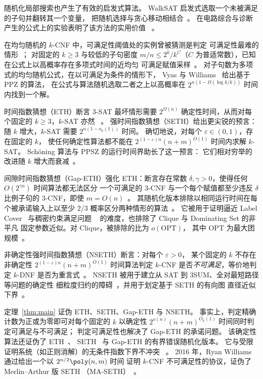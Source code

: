 随机化局部搜索也产生了有效的启发式算法。
WalkSAT 启发式选取一个未被满足的子句并翻转其一个变量，
把随机选择与贪心移动相结合~\cite{SKC94}。
在电路综合与诊断产生的公式上的实验表明了该方法的实用价值
~\cite[pp.~340--342, Tables~4--5]{SKC94}。

在均匀随机的 $k$-CNF 中，可满足性阈值处的实例曾被猜测是判定
可满足性最难的情形~\cite[Section~1]{VW21}；
对固定的 $k\ge3$ 与较低的子句密度 $m/n\le 2^k/k^C$（$C$
为普适常数），已知在公式上以高概率存在多项式时间的近均匀
可满足赋值采样~\cite[Theorem~1.2]{CLWYY25}。
对子句数为多项式的均匀随机公式，在以可满足为条件的情形下，
Vyas 与 Williams~\cite[Theorem~3]{VW21} 给出基于 PPZ 的算法，
在公式与算法随机选取二者之上以高概率在
$2^{n(1-\Omega(\log k/k))}$ 时间内找到一个解。

时间指数猜想（ETH）断言 $3$-SAT 最坏情形需要 $2^{\Omega(n)}$
确定性时间，从而对每个固定的 $k\ge3$，$k$-SAT 亦然
~\cite[Theorem~1]{IP01}。
强时间指数猜想（SETH）给出更尖锐的预言：随 $k$ 增大，$k$-SAT
需要 $2^{n(1-o_k(1))}$ 时间。
确切地说，对每个 $\varepsilon\in(0,1)$，存在固定的 $k$，
使任何确定性算法都不能在 $2^{(1-\varepsilon)n}(n+m)^{O(1)}$
时间内求解 $k$-SAT。
Sch\"oning 算法与 PPSZ 的运行时间界助长了这一预言：
它们相对穷举的改进随 $k$ 增大而衰减~\cite[Open Problems, item~2]{IP01}。

间隙时间指数猜想（Gap-ETH）强化 ETH：断言存在常数
$\delta,\gamma>0$，使得任何 $O(2^{\gamma n})$ 时间算法都无法区分
一个可满足的 $3$-CNF 与一个每个赋值都至少违反 $\delta$
比例子句的 $3$-CNF，即使 $m=O(n)$~\cite{Din16,MR17}。
其随机化版本排除以相同运行时间在每个被承诺输入上以至少 $2/3$
概率区分两种情形的算法~\cite[Conjecture~2.5]{CCK20}。
它被用于证明逼近 Label Cover~\cite{Din16} 与稠密约束满足问题
~\cite{MR17} 的难度，也排除了 Clique 与 Dominating Set 的非平凡
固定参数近似。对 Clique，被排除的比为 $o(\mathrm{OPT})$，
其中 $\mathrm{OPT}$ 为最大团规模~\cite[Corollaries~5.3 and~5.6]{CCK20}。

非确定性强时间指数猜想（NSETH）断言：对每个 $\varepsilon>0$，
某个固定的 $k$ 不存在非确定性 $2^{(1-\varepsilon)n}(n+m)^{O(1)}$
时间算法判定 $k$-CNF 是否\emph{不可满足}，等价地判定 $k$-DNF
是否为重言式~\cite{CGIMPS16}。
NSETH 被用于建立从 SAT 到 3SUM、全对最短路径等问题的确定性
细粒度归约的障碍~\cite{CGIMPS16}，并用于划定基于 SETH 的有向图
直径近似下界~\cite{Li21}。

定理~\ref{thm:main} 证伪 ETH、SETH、Gap-ETH 与 NSETH。
事实上，判定精确计数为正或为零即可对每个固定的 $k$ 以确定性
$2^{o(n)}(n+m)^{O_k(1)}$ 时间同时判定可满足与不可满足；
判定可满足性也解决了 Gap-ETH 的承诺问题。
该确定性算法还证伪了 ETH~\cite[Section~1]{DHMTW}、
SETH~\cite[Definition~2.1]{CDL16} 与 Gap-ETH 的有界错误随机化版本。
它与受限证明系统（如正则消解）的无条件指数下界不冲突
~\cite{BeckImp13}。
2016 年，Ryan Williams 通过给出一个以 $2^{n/2}\poly(n,m)$ 时间
证明 $k$-CNF 不可满足性的协议，证伪了 Merlin--Arthur 版 SETH
（MA-SETH）~\cite[Theorem~3.3]{Wil16}。


